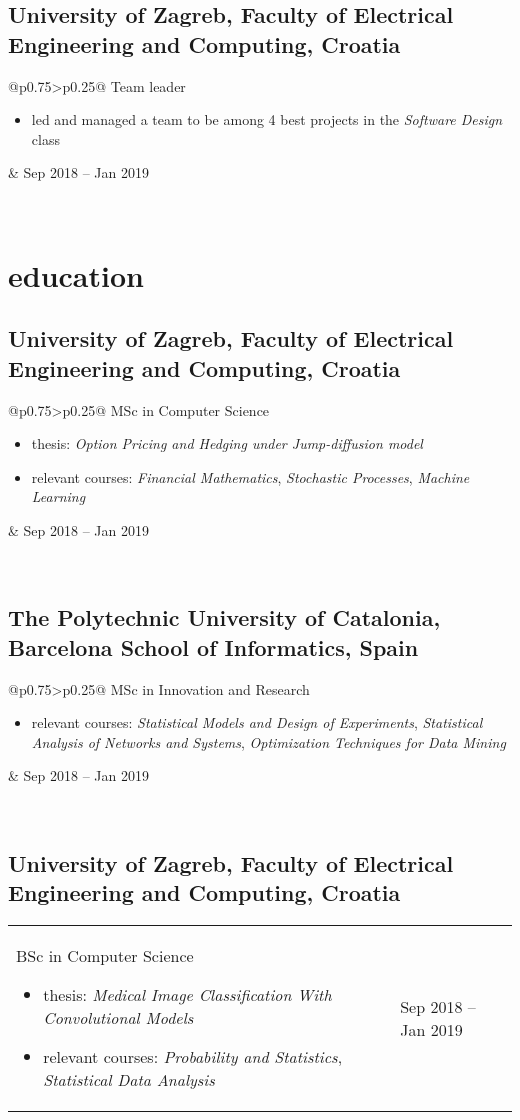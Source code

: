 \documentclass[a4paper]{article}
\makeatletter
\newlength{\tablewidth}
\newenvironment{period}[2]{%
\newcommand{\sarma}{#2}%
\setlength{\tablewidth}{\linewidth}
\addtolength{\tablewidth}{-2\tabcolsep}
\begin{tabular}{@{}p{0.75\tablewidth}>{\raggedleft\arraybackslash}p{0.25\tablewidth}@{}}%
#1 \newline
\begin{itemize}
}{%
\end{itemize} & \sarma \\%
\end{tabular}\\
}
\makeatother
\begin{document}
\subsection{University of Zagreb, Faculty of Electrical Engineering and Computing, Croatia}
\begin{period}{Team leader}{Sep 2018 -- Jan 2019}
    \item led and managed a team to be among 4 best projects in the \textit{Software Design} class
\end{period}

\section{education}
\subsection{University of Zagreb, Faculty of Electrical Engineering and Computing, Croatia}
\begin{period}{MSc in Computer Science}{Sep 2019 -- July 2022}
    \item thesis:
        \textit{Option Pricing and Hedging under Jump-diffusion model}
    \item relevant courses:
        \textit{Financial Mathematics},
        \textit{Stochastic Processes},
        \textit{Machine Learning}
\end{period}
\subsection{The Polytechnic University of Catalonia, Barcelona School of Informatics, Spain}
\begin{period}{MSc in Innovation and Research}{Sep 2020 -- Jan 2021}
    \item relevant courses:
        \textit{Statistical Models and Design of Experiments},
        \textit{Statistical Analysis of Networks and Systems},
        \textit{Optimization Techniques for Data Mining}
\end{period}
\subsection{University of Zagreb, Faculty of Electrical Engineering and Computing, Croatia}
\begin{period}{BSc in Computer Science}{Sep 2016 -- Jul 2019}
    \item thesis:
        \textit{Medical Image Classification With Convolutional Models}
    \item relevant courses:
        \textit{Probability and Statistics},
        \textit{Statistical Data Analysis}
\end{period}
\end{document}
